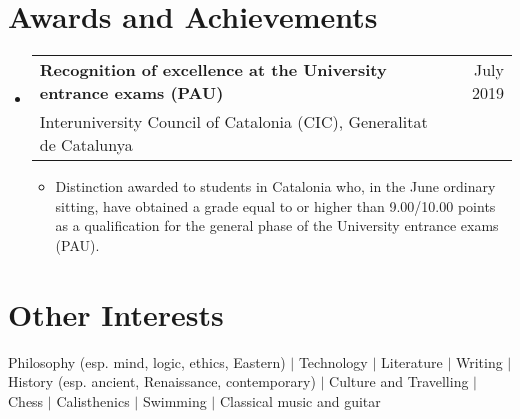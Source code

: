 \documentclass[a4paper,10pt]{article}
\makeatletter
\newcommand{\resumeQuadHeading}[4]{
  \item
  \begin{tabular*}{0.96\textwidth}[t]{l@{\extracolsep{\fill}}r}
    \textbf{#1} & \small #2 \\
    \small#3 & \small #4 \\
  \end{tabular*}
}
\newcommand{\resumeHeadingListStart}{
  \begin{itemize}[leftmargin=0.15in, label={}]
}
\newcommand{\resumeHeadingListEnd}{\end{itemize}}
\makeatother
\begin{document}

\section{Awards and Achievements}
  \resumeHeadingListStart{}
    \resumeQuadHeading{Recognition of excellence at the University entrance exams (PAU)}{July 2019}{Interuniversity Council of Catalonia (CIC), Generalitat de Catalunya}{\ }
    \begin{itemize}[leftmargin=3em, itemsep=0.1em, topsep=2pt]
      \item \small Distinction awarded to students in Catalonia who, in the June ordinary sitting, have obtained a grade equal to or higher than 9.00/10.00 points as a qualification for the general phase of the University entrance exams (PAU).
    \end{itemize}
  \resumeHeadingListEnd{}

\section{Other Interests}
  Philosophy \small{(esp. mind, logic, ethics, Eastern)} \normalsize{\; $|$ \; Technology \; $|$ \; Literature \; $|$ \; Writing \; $|$ \; History} \small{(esp. ancient, Renaissance, contemporary)} \normalsize{\; $|$ \; Culture and Travelling \; $|$ \; Chess \; $|$ \; Calisthenics \; $|$ \; Swimming \; $|$ \; Classical music and guitar}
\end{document}
